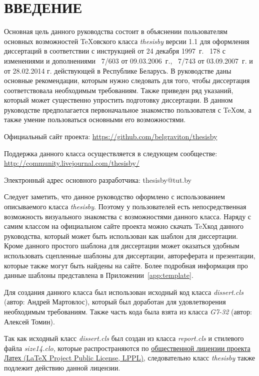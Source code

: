 \chapter*{ВВЕДЕНИЕ}

Основная цель данного руководства состоит в объяснении пользователям основных
возможностей \TeX овского класса {\itshape thesisby} версии 1.1 для  оформления
диссертаций в соответствии с инструкцией  от 24 декабря 1997~г. \textnumero ~178 с
изменениями и дополнениями \textnumero 7/603 от 09.03.2006~г., \textnumero 7/743 от
03.09.2007~г. и  от 28.02.2014 г. действующей в Республике Беларусь. В руководстве даны основные рекомендации, которым нужно следовать для того, чтобы диссертация соответствовала необходимым требованиям. Также приведен ряд указаний, который может существенно упростить подготовку диссертации. В данном руководстве предполагается первоначальное знакомство пользователя с \TeX ом, а также умение пользоваться основными его возможностями.

Официальный сайт проекта:
\href{https://github.com/belgraviton/thesisby}{https://github.com/belgraviton/thesisby}

Поддержка данного класса осуществляется в следующем сообществе:
\href{http://community.livejournal.com/thesisby/}{
http://community.livejournal.com/thesisby/}

Электронный адрес основного разработчика: thesisby@tut.by

Следует заметить, что данное руководство оформлено с использованием описываемого класса {\itshape thesisby}. Поэтому у пользователей есть непосредственная возможность визуального знакомства с возможностями данного класса. Наряду с самим классом на официальном сайте проекта можно скачать \TeX код данного руководства, который может быть использован как шаблон для диссертации. Кроме данного простого шаблона для диссертации может оказаться удобным использовать сцепленные шаблоны для диссертации, автореферата и презентации, которые также могут быть найдены на сайте. Более подробная информация про данные шаблоны представлена в Приложении~\ref{app:template}.

Для создания данного класса был использован исходный код класса {\itshape
dissert.cls} (автор: Андрей Мартовлос), который был доработан для удовлетворения
необходимым требованиям. Также часть кода была взята из класса {\itshape G7-32}
(автор: Алексей Томин). 

Так как исходный класс {\itshape dissert.cls} был создан из класса {\itshape report.cls} и  стилевого файла {\itshape size14.clo}, которые распространяются по \href{http://www.latex-project.org/lppl/}{общественной лицензии проекта Латех (LaTeX Project Public License, LPPL)}, следовательно класс {\itshape thesisby} также подлежит действию данной лицензии.

